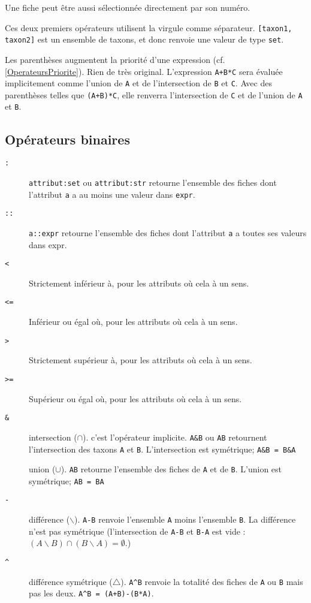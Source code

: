 \documentclass[11pt]{article}
\begin{document}
Une fiche peut être aussi sélectionnée directement par son numéro.

Ces deux premiers opérateurs utilisent la virgule comme séparateur.
\texttt{{[}taxon1, taxon2{]}} est un ensemble de taxons, et donc renvoie
une valeur de type \texttt{set}.

\begin{description}
\itemsep1pt\parskip0pt
\item[\texttt{()}]
Les parenthèses augmentent la priorité d'une expression (cf.
\vref{OperateursPriorite}). Rien de très original. L'expression
\texttt{A+B*C} sera évaluée implicitement comme l'union de \texttt{A} et
de l'intersection de \texttt{B} et \texttt{C}. Avec des parenthèses
telles que \texttt{(A+B)*C}, elle renverra l'intersection de \texttt{C}
et de l'union de \texttt{A} et \texttt{B}.
\end{description}

\subsection{Opérateurs binaires}\label{opuxe9rateurs-binaires}

\begin{description}
\item[\texttt{:}]
\texttt{attribut:set} ou \texttt{attribut:str} retourne l'ensemble des
fiches dont l'attribut \texttt{a} a au moins une valeur dans
\texttt{expr}.
\item[\texttt{::}]
\texttt{a::expr} retourne l'ensemble des fiches dont l'attribut
\texttt{a} a toutes ses valeurs dans expr.
\item[\texttt{\textless{}}]
Strictement inférieur à, pour les attributs où cela à un sens.
\item[\texttt{\textless{}=}]
Inférieur ou égal où, pour les attributs où cela à un sens.
\item[\texttt{\textgreater{}}]
Strictement supérieur à, pour les attributs où cela à un sens.
\item[\texttt{\textgreater{}=}]
Supérieur ou égal où, pour les attributs où cela à un sens.
\item[\texttt{\&}]
intersection ($\cap$). c'est l'opérateur implicite. \texttt{A\&B} ou
\texttt{AB} retournent l'intersection des taxons \texttt{A} et
\texttt{B}. L'intersection est symétrique; \texttt{A\&B = B\&A}
\item[\texttt{\textbar{}}]
union ($\cup$). \texttt{A\textbar{}B} retourne l'ensemble des fiches de
\texttt{A} et de \texttt{B}. L'union est symétrique;
\texttt{A\textbar{}B = B\textbar{}A}
\item[\texttt{-}]
différence ($\backslash$). \texttt{A-B} renvoie l'ensemble \texttt{A}
moins l'ensemble \texttt{B}. La différence n'est pas symétrique
(l'intersection de \texttt{A-B} et \texttt{B-A} est vide :
$(A\backslash B)\cap(B\backslash A)=\emptyset$.)
\item[\texttt{\^{}}]
différence symétrique ($\bigtriangleup$). \texttt{A\^{}B} renvoie la
totalité des fiches de \texttt{A} ou \texttt{B} mais pas les deux.
\texttt{A\^{}B = (A+B)-(B*A)}.
\end{description}
\end{document}
